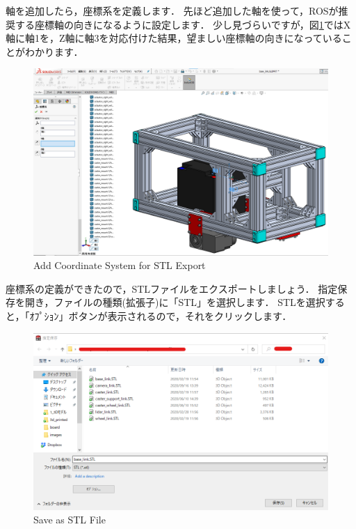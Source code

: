 \documentclass[{../../master}]{subfiles}
\begin{document}
\noindent
軸を追加したら，座標系を定義します．
先ほど追加した軸を使って，ROSが推奨する座標軸の向きになるように設定します．
少し見づらいですが，図\ref{fig:base_link_create_coordinate_system}ではX軸に軸1を，Z軸に軸3を対応付けた結果，望ましい座標軸の向きになっていることがわかります．

\begin{figure}[ht]
  \centering
  \includegraphics[width=100truemm, clip]{images/base_link_create_coordinate_system.png}
  \caption{Add Coordinate System for STL Export}
  \label{fig:base_link_create_coordinate_system}
\end{figure}

座標系の定義ができたので，STLファイルをエクスポートしましょう．
指定保存を開き，ファイルの種類(拡張子)に「STL」を選択します．
STLを選択すると，「ｵﾌﾟｼｮﾝ」ボタンが表示されるので，それをクリックします．

\begin{figure}[ht]
  \centering
  \includegraphics[width=100truemm, clip]{images/base_link_save_as_stl.png}
  \caption{Save as STL File}
  \label{fig:base_link_save_as_stl}
\end{figure}
\end{document}
